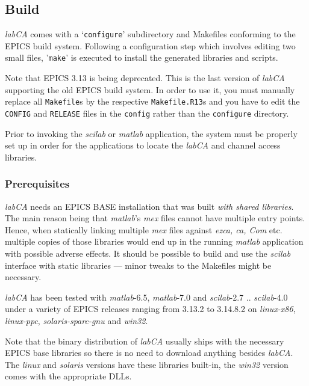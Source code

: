 \documentclass{article}
\newcommand{\sca}{\ita{labCA}}
\newcommand{\scilab}{\ita{scilab}}
\newcommand{\matlab}{\ita{matlab}}
\newcommand{\windoze}{\ita{win32}}
\newcommand{\com}[1]{{\tt #1}}
\newcommand{\ita}[1]{\emph{#1}}
\begin{document}
\subsection{Build}
\sca{} comes with a `\com{configure}' subdirectory and Makefiles conforming to the
EPICS build system. Following a configuration step which involves editing
two small files, '\com{make}' is executed to install the generated libraries
and scripts.

Note that EPICS 3.13 is being deprecated. This is the last version of \sca{}
supporting the old EPICS build system. In order to use it, you must manually
replace all \com{Makefile}s by the respective \com{Makefile.R13}s and you
have to edit the \com{CONFIG} and \com{RELEASE} files in the \com{config}
rather than the \com{configure} directory.

Prior to invoking the \scilab{} or \matlab{} application, the system
must be properly set up in order for the applications to locate the
\sca{} and channel access libraries.

\subsubsection{Prerequisites}
\sca{} needs an EPICS BASE installation that was built \ita{with shared
libraries}. The main reason being that \matlab's \ita{mex} files cannot
have multiple entry points. Hence, when statically linking multiple \ita{mex}
files against \ita{ezca, ca, Com} etc. multiple copies of those libraries
would end up in the running \matlab{} application with possible adverse
effects. It should be possible to build and use the \scilab{} interface
with static libraries --- minor tweaks to the Makefiles might be necessary.

\sca{} has been tested with \matlab-6.5, \matlab-7.0 and \scilab-2.7 .. \scilab-4.0
under a variety of EPICS releases ranging from 3.13.2
to 3.14.8.2 on \ita{linux-x86}, \ita{linux-ppc}, \ita{solaris-sparc-gnu}
and \windoze.

Note that the binary distribution of \sca{} usually ships with the
necessary EPICS base libraries so there is no need to download anything
besides \sca. The \ita{linux}
and \ita{solaris} versions have these libraries built-in, the \windoze
version comes with the appropriate DLLs.
\end{document}

